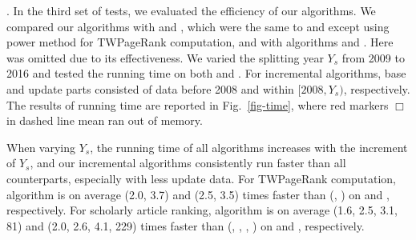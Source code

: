 


.
In the third set of tests, we evaluated the efficiency of our algorithms.
%
We compared our algorithms with \powtwprscc and \powensemble, which were the same to \twprscc and \batensemble except using power method for TWPageRank computation, and with algorithms \futurerank and \hhgrank.
Here \pagerank was omitted due to its effectiveness.
%
We varied the splitting year $Y_s$ from 2009 to 2016 and tested the running time on both \aminer and \magdata.
%
For incremental algorithms, base and update parts consisted of data before 2008 and within $[2008, Y_s)$, respectively.
%
The results of running time are reported in Fig.~\ref{fig-time}, where red markers $\Box$ in dashed line mean \hhgrank ran out of memory.

When varying $Y_s$, the running time of all algorithms increases with the increment of $Y_s$, and our incremental algorithms
consistently run faster than all counterparts, especially with less update data.
%
For TWPageRank computation, algorithm \inctwprscc is on average (2.0, 3.7) and (2.5, 3.5) times faster than (\twprscc, \powtwprscc) on \aminer and \magdata, respectively.
%
For scholarly article ranking, algorithm \incensemble is on average (1.6, 2.5, 3.1, 81) and (2.0, 2.6, 4.1, 229) times faster than (\batensemble, \powensemble, \futurerank, \hhgrank) on \aminer and \magdata, respectively.

